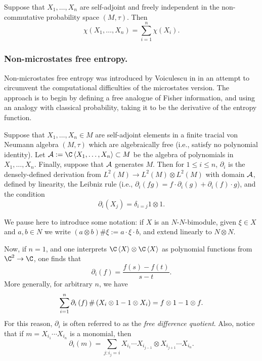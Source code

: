 \begin{theorem}
	Suppose that $X_1, \ldots, X_n$ are self-adjoint and freely independent in the non-commutative probability space $(M, \tau)$.
	Then
	$$\chi(X_1, \ldots, X_n) = \sum_{i=1}^n \chi(X_i).$$
\end{theorem}

\subsubsection{Non-microstates free entropy.}
Non-microstates free entropy was introduced by Voiculescu in \cite{voiculescu1998fisherinfov} in an attempt to circumvent the computational difficulties of the microstates version.
The approach is to begin by defining a free analogue of Fisher information, and using an analogy with classical probability, taking it to be the derivative of the entropy function.

\begin{definition}
	\label{defn:freedifferencequotients}
	Suppose that $X_1, \ldots, X_n \in M$ are self-adjoint elements in a finite tracial von Neumann algebra $(M, \tau)$ which are algebraically free (i.e., satisfy no polynomial identity).
	Let $\A := \C\ang{X_1, \ldots, X_n} \subset M$ be the algebra of polynomials in $X_1, \ldots, X_n$.
	Finally, suppose that $\mathcal{A}$ generates $M$.
	Then for $1 \leq i \leq n$, $\partial_i$ is the densely-defined derivation from $L^2(M) \to L^2(M)\otimes L^2(M)$ with domain $\mathcal{A}$, defined by linearity, the Leibniz rule (i.e., $\partial_i(fg) = f\cdot \partial_i(g) + \partial_i(f) \cdot g$), and the condition
	$$\partial_i(X_j) = \delta_{i=j}1\otimes1.$$
\end{definition}

We pause here to introduce some notation: if $X$ is an $N$-$N$-bimodule, given $\xi \in X$ and $a, b\in N$ we write $(a\otimes b) \# \xi := a\cdot\xi\cdot b$, and extend linearly to $N\otimes N$.

Now, if $n = 1$, and one interprets $\C\ang{X}\otimes\C\ang{X}$ as polynomial functions from $\C^2 \to \C$, one finds that
$$\partial_i(f) = \frac{f(s) - f(t)}{s-t}.$$
More generally, for arbitrary $n$, we have
$$\sum_{i=1}^n \partial_i\left(f\right) \# \left(X_i\otimes 1 - 1 \otimes X_i\right) = f\otimes 1 - 1\otimes f.$$
For this reason, $\partial_i$ is often referred to as the \emph{free difference quotient}.
Also, notice that if $m = X_{i_1}\cdots X_{i_n}$ is a monomial, then
$$\partial_i(m) = \sum_{j : i_j = i} X_{i_1}\cdots X_{i_{j-1}} \otimes X_{i_{j+1}} \cdots X_{i_n}.$$


